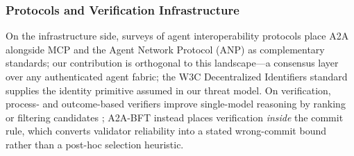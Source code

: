 \documentclass{article}
\begin{document}
\subsubsection{Protocols and Verification Infrastructure}

On the infrastructure side, surveys of agent interoperability protocols \citep{ehtesham2025survey} place A2A alongside MCP \citep{mcp_2024} and the Agent Network Protocol (ANP) as complementary standards; our contribution is orthogonal to this landscape---a consensus layer over any authenticated agent fabric; the W3C Decentralized Identifiers standard \citep{did_core} supplies the identity primitive assumed in our threat model. On verification, process- and outcome-based verifiers improve single-model reasoning by ranking or filtering candidates \citep{gsm8k,lightman2024verify}; A2A-BFT instead places verification \emph{inside} the commit rule, which converts validator reliability into a stated wrong-commit bound rather than a post-hoc selection heuristic.
\end{document}
